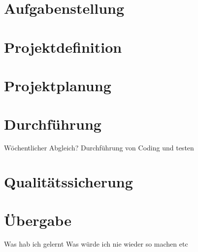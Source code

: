 


%
%

\begin{singlespace}
	\tableofcontents{}	\pagebreak
\end{singlespace}

\pagestyle{scrheadings} 	%
\setcounter{page}{1}
\section{Aufgabenstellung}

\pagebreak
\section{Projektdefinition}

\section{Projektplanung}

\section{Durchführung}
	Wöchentlicher Abgleich?
	Durchführung von Coding und testen
\pagebreak
\section{Qualitätssicherung}
\section{Übergabe}
	Was hab ich gelernt
	Was würde ich nie wieder so machen
	etc

\pagebreak
\printbibliography
\pagebreak



